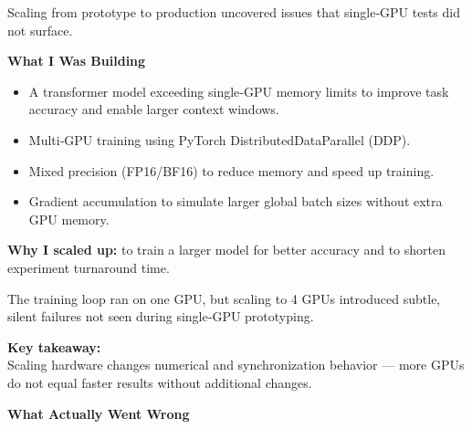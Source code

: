 \documentclass[11pt]{article}
\begin{document}
{\large\color{brandgray}
Scaling from prototype to production uncovered issues that single‑GPU tests did not surface.
}

\vspace{0.15in}

\begin{darkbox}
{\large\textbf{What I Was Building}}

\vspace{0.05in}
\begin{itemize}[leftmargin=*, itemsep=0.08in, label={\color{brandblue}\textbullet}]
    \item A transformer model exceeding single‑GPU memory limits to improve task accuracy and enable larger context windows.
    \item Multi‑GPU training using PyTorch DistributedDataParallel (DDP).
    \item Mixed precision (FP16/BF16) to reduce memory and speed up training.
    \item Gradient accumulation to simulate larger global batch sizes without extra GPU memory.
\end{itemize}
\end{darkbox}

\vspace{0.15in}

\textbf{Why I scaled up:} to train a larger model for better accuracy and to shorten experiment turnaround time.

\vspace{0.15in}

The training loop ran on one GPU, but scaling to 4 GPUs introduced subtle, silent failures not seen during single‑GPU prototyping.

\vspace{0.15in}

\begin{infobox}
\textbf{Key takeaway:}\\
Scaling hardware changes numerical and synchronization behavior — more GPUs do not equal faster results without additional changes.
\end{infobox}


\vspace*{0.2in}

\begin{center}
{\fontsize{26}{30}\selectfont\color{brandnavy}\bfseries 
What Actually Went Wrong}
\end{center}
\end{document}
